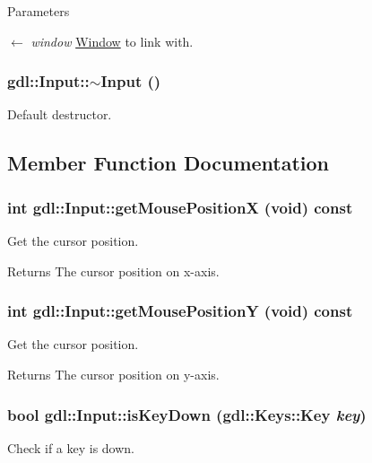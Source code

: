 \begin{DoxyParams}{Parameters}
\item[\mbox{$\leftarrow$} {\em window}]\hyperlink{classgdl_1_1Window}{Window} to link with. \end{DoxyParams}
\hypertarget{classgdl_1_1Input_aa9c7fd004ef583434b65ddf7ebbad9bc}{
\subsubsection[{$\sim$Input}]{\setlength{\rightskip}{0pt plus 5cm}gdl::Input::$\sim$Input ()}}
\label{classgdl_1_1Input_aa9c7fd004ef583434b65ddf7ebbad9bc}
Default destructor. 

\subsection{Member Function Documentation}
\hypertarget{classgdl_1_1Input_a1a9f9de83134c8ea6e62ece2163868ca}{
\subsubsection[{getMousePositionX}]{\setlength{\rightskip}{0pt plus 5cm}int gdl::Input::getMousePositionX (void) const}}
\label{classgdl_1_1Input_a1a9f9de83134c8ea6e62ece2163868ca}
Get the cursor position.

\begin{DoxyReturn}{Returns}
The cursor position on x-\/axis. 
\end{DoxyReturn}
\hypertarget{classgdl_1_1Input_a8732662c038df92f1cb422973b675288}{
\subsubsection[{getMousePositionY}]{\setlength{\rightskip}{0pt plus 5cm}int gdl::Input::getMousePositionY (void) const}}
\label{classgdl_1_1Input_a8732662c038df92f1cb422973b675288}
Get the cursor position.

\begin{DoxyReturn}{Returns}
The cursor position on y-\/axis. 
\end{DoxyReturn}
\hypertarget{classgdl_1_1Input_ae0bfa17187848fd6a1576eb1e8204230}{
\subsubsection[{isKeyDown}]{\setlength{\rightskip}{0pt plus 5cm}bool gdl::Input::isKeyDown (gdl::Keys::Key {\em key})}}
\label{classgdl_1_1Input_ae0bfa17187848fd6a1576eb1e8204230}
Check if a key is down.


